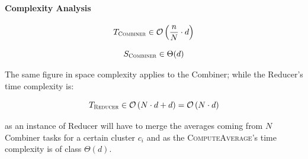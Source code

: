 \documentclass[parskip=full]{report}
\begin{document}


%

\paragraph{Complexity Analysis}

\[
T_\textsc{Combiner} \in \mathcal{O}\left(\dfrac{n}{N} \cdot d\right)
\]


\[
S_\textsc{Combiner} \in \Theta(d)
\]

The same figure in space complexity applies to the Combiner; while the 
Reducer's time complexity is:

\[
T_\textsc{Reducer} \in \mathcal{O}\left(N \cdot d + d\right) = 
\mathcal{O}\left(N \cdot d\right)
\]

as an instance of Reducer will have to merge the averages coming from $N$ 
Combiner tasks for a certain cluster $c_i$ and as the 
\textsc{ComputeAverage}'s time complexity is of class $\Theta(d)$.
\end{document}
